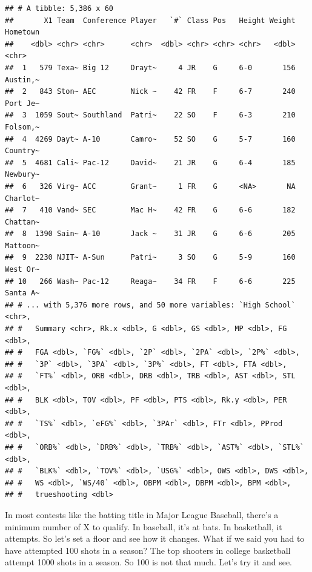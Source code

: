 \documentclass[]{book}
\newenvironment{Shaded}{\begin{snugshade}}{\end{snugshade}}
\newcommand{\KeywordTok}[1]{\textcolor[rgb]{0.13,0.29,0.53}{\textbf{#1}}}
\newcommand{\DataTypeTok}[1]{\textcolor[rgb]{0.13,0.29,0.53}{#1}}
\newcommand{\DecValTok}[1]{\textcolor[rgb]{0.00,0.00,0.81}{#1}}
\newcommand{\StringTok}[1]{\textcolor[rgb]{0.31,0.60,0.02}{#1}}
\newcommand{\OperatorTok}[1]{\textcolor[rgb]{0.81,0.36,0.00}{\textbf{#1}}}
\newcommand{\NormalTok}[1]{#1}
\begin{document}
\begin{verbatim}
## # A tibble: 5,386 x 60
##       X1 Team  Conference Player   `#` Class Pos   Height Weight Hometown
##    <dbl> <chr> <chr>      <chr>  <dbl> <chr> <chr> <chr>   <dbl> <chr>   
##  1   579 Texa~ Big 12     Drayt~     4 JR    G     6-0       156 Austin,~
##  2   843 Ston~ AEC        Nick ~    42 FR    F     6-7       240 Port Je~
##  3  1059 Sout~ Southland  Patri~    22 SO    F     6-3       210 Folsom,~
##  4  4269 Dayt~ A-10       Camro~    52 SO    G     5-7       160 Country~
##  5  4681 Cali~ Pac-12     David~    21 JR    G     6-4       185 Newbury~
##  6   326 Virg~ ACC        Grant~     1 FR    G     <NA>       NA Charlot~
##  7   410 Vand~ SEC        Mac H~    42 FR    G     6-6       182 Chattan~
##  8  1390 Sain~ A-10       Jack ~    31 JR    G     6-6       205 Mattoon~
##  9  2230 NJIT~ A-Sun      Patri~     3 SO    G     5-9       160 West Or~
## 10   266 Wash~ Pac-12     Reaga~    34 FR    F     6-6       225 Santa A~
## # ... with 5,376 more rows, and 50 more variables: `High School` <chr>,
## #   Summary <chr>, Rk.x <dbl>, G <dbl>, GS <dbl>, MP <dbl>, FG <dbl>,
## #   FGA <dbl>, `FG%` <dbl>, `2P` <dbl>, `2PA` <dbl>, `2P%` <dbl>,
## #   `3P` <dbl>, `3PA` <dbl>, `3P%` <dbl>, FT <dbl>, FTA <dbl>,
## #   `FT%` <dbl>, ORB <dbl>, DRB <dbl>, TRB <dbl>, AST <dbl>, STL <dbl>,
## #   BLK <dbl>, TOV <dbl>, PF <dbl>, PTS <dbl>, Rk.y <dbl>, PER <dbl>,
## #   `TS%` <dbl>, `eFG%` <dbl>, `3PAr` <dbl>, FTr <dbl>, PProd <dbl>,
## #   `ORB%` <dbl>, `DRB%` <dbl>, `TRB%` <dbl>, `AST%` <dbl>, `STL%` <dbl>,
## #   `BLK%` <dbl>, `TOV%` <dbl>, `USG%` <dbl>, OWS <dbl>, DWS <dbl>,
## #   WS <dbl>, `WS/40` <dbl>, OBPM <dbl>, DBPM <dbl>, BPM <dbl>,
## #   trueshooting <dbl>
\end{verbatim}

In most contests like the batting title in Major League Baseball,
there's a minimum number of X to qualify. In baseball, it's at bats. In
basketball, it attempts. So let's set a floor and see how it changes.
What if we said you had to have attempted 100 shots in a season? The top
shooters in college basketball attempt 1000 shots in a season. So 100 is
not that much. Let's try it and see.

\begin{Shaded}
\end{Shaded}
\end{document}

